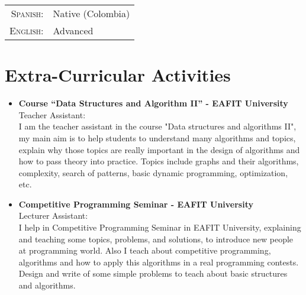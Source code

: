 \documentclass[a4paper,10pt]{article} %
\begin{document}
\begin{tabular}{rl}
\textsc{Spanish:} & Native (Colombia)\\
\textsc{English:} & Advanced \\
\end{tabular}


\section{Extra-Curricular Activities}
\begin{itemize}
\item \textbf{Course ``Data Structures and Algorithm II'' - EAFIT University}\\
Teacher Assistant:\\
I am the teacher assistant in the course "Data structures and algorithms II", my main aim is to help students to understand many algorithms and topics, explain why those topics are really important in the design of algorithms and how to pass theory into practice. Topics include graphs and their algorithms, complexity, search of patterns, basic dynamic programming, optimization, etc.\\
\item \textbf{Competitive Programming Seminar - EAFIT University}\\
Lecturer Assistant:\\
I help in Competitive Programming Seminar in EAFIT University, explaining and teaching some topics, problems, and solutions, to introduce new people at programming world. Also I teach about competitive programming, algorithms and how to apply this algorithms in a real programming contests.
Design and write of some simple problems to teach about basic structures and algorithms.
\end{itemize}

\end{document}
